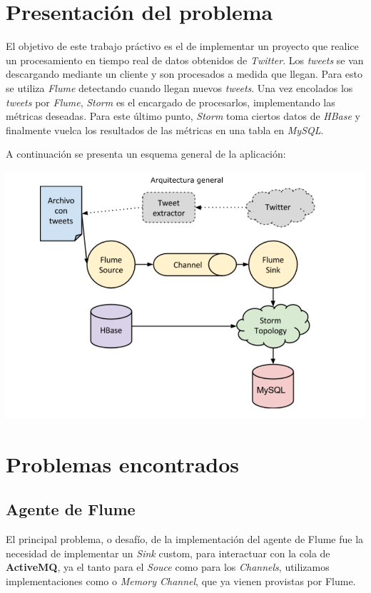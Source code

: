 \documentclass[a4paper,10pt]{article}
\begin{document}
\setcounter{page}{1}


\section{Presentación del problema}
El objetivo de este trabajo práctivo es el de implementar un proyecto que realice un procesamiento en tiempo real de datos obtenidos de \textit{Twitter}.
Los \textit{tweets} se van descargando mediante un cliente y son procesados a medida que llegan. Para esto se utiliza \textit{Flume} detectando cuando llegan nuevos \textit{tweets}.
Una vez encolados los \textit{tweets} por \textit{Flume}, \textit{Storm} es el encargado de procesarlos, implementando las métricas deseadas. Para este último punto, \textit{Storm}
toma ciertos datos de \textit{HBase} y finalmente vuelca los resultados de las métricas en una tabla en \textit{MySQL}.

A continuación se presenta un esquema general de la aplicación:

\includegraphics[width=\linewidth]{images/tp2BD.png}

\section{Problemas encontrados}

\subsection{Agente de Flume}
El principal problema, o desafío, de la implementación del agente de Flume fue la necesidad de implementar un \textit{Sink} custom, para interactuar con la cola
de \textbf{ActiveMQ}, ya el tanto para el \textit{Souce} como para los \textit{Channels}, utilizamos implementaciones como  o \textit{Memory Channel},
que ya vienen provistas por Flume.
\end{document}

